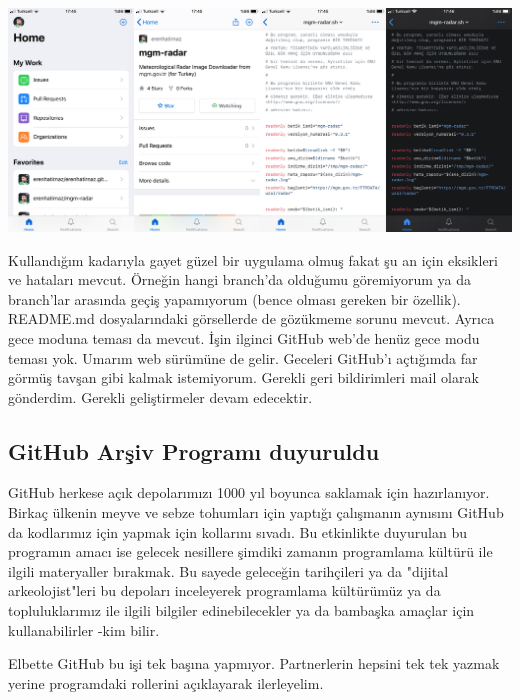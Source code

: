 \documentclass[11pt]{article}
\begin{document}
\begin{center}
\includegraphics[width=.9\linewidth]{gorseller/github-mobile-ios.png}
\end{center}

Kullandığım kadarıyla gayet güzel bir uygulama olmuş fakat şu an için
eksikleri ve hataları mevcut. Örneğin hangi branch'da olduğumu göremiyorum ya
da branch'lar arasında geçiş yapamıyorum (bence olması gereken bir özellik).
README.md dosyalarındaki görsellerde de gözükmeme sorunu mevcut. Ayrıca gece
moduna teması da mevcut. İşin ilginci GitHub web'de henüz gece modu teması
yok. Umarım web sürümüne de gelir. Geceleri GitHub'ı açtığımda far görmüş
tavşan gibi kalmak istemiyorum. Gerekli geri bildirimleri mail olarak
gönderdim. Gerekli geliştirmeler devam edecektir.
\subsection{GitHub Arşiv Programı duyuruldu}
\label{sec:org5252ac7}
GitHub herkese açık depolarımızı 1000 yıl boyunca saklamak için hazırlanıyor.
Birkaç ülkenin meyve ve sebze tohumları için yaptığı çalışmanın aynısını
GitHub da kodlarımız için yapmak için kollarını sıvadı. Bu etkinlikte
duyurulan bu programın amacı ise gelecek nesillere şimdiki zamanın programlama
kültürü ile ilgili materyaller bırakmak. Bu sayede geleceğin tarihçileri ya da
"dijital arkeolojist"leri bu depoları inceleyerek programlama kültürümüz ya da
topluluklarımız ile ilgili bilgiler edinebilecekler ya da bambaşka amaçlar
için kullanabilirler -kim bilir.

Elbette GitHub bu işi tek başına yapmıyor. Partnerlerin hepsini tek tek yazmak
yerine programdaki rollerini açıklayarak ilerleyelim.
\end{document}
